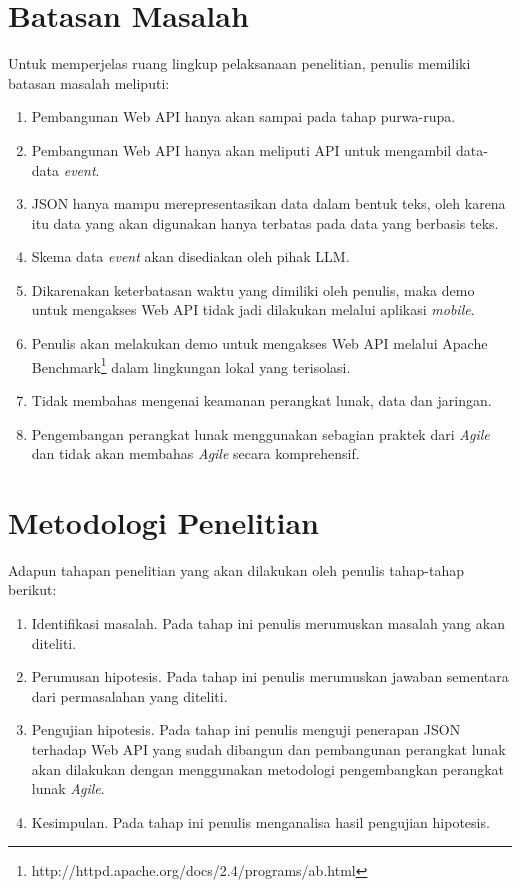 \documentclass[a4paper, 12pt, oneside]{report}
\begin{document}
\section{Batasan Masalah}
\onehalfspacing Untuk memperjelas ruang lingkup pelaksanaan penelitian, penulis memiliki batasan masalah meliputi:
\onehalfspacing
\begin{enumerate}
  \item Pembangunan Web API hanya akan sampai pada tahap purwa-rupa.
  \item Pembangunan Web API hanya akan meliputi API untuk mengambil data-data \textit{event}.
  \item JSON hanya mampu merepresentasikan data dalam bentuk teks, oleh karena itu data yang akan digunakan hanya terbatas pada data yang berbasis teks.
  \item Skema data \textit{event} akan disediakan oleh pihak LLM.
  \item Dikarenakan keterbatasan waktu yang dimiliki oleh penulis, maka demo untuk mengakses Web API tidak jadi dilakukan melalui aplikasi \textit{mobile}.
  \item Penulis akan melakukan demo untuk mengakses Web API melalui Apache Benchmark\footnote{http://httpd.apache.org/docs/2.4/programs/ab.html} dalam lingkungan lokal yang terisolasi.
  \item Tidak membahas mengenai keamanan perangkat lunak, data dan jaringan.
  \item Pengembangan perangkat lunak menggunakan sebagian praktek dari \textit{Agile} dan tidak akan membahas \textit{Agile} secara komprehensif.
\end{enumerate}

\section{Metodologi Penelitian}
\onehalfspacing Adapun tahapan penelitian yang akan dilakukan oleh penulis tahap-tahap berikut:
\begin{enumerate}
  \item Identifikasi masalah. Pada tahap ini penulis merumuskan masalah yang akan diteliti.
  \item Perumusan hipotesis. Pada tahap ini penulis merumuskan jawaban sementara dari permasalahan yang diteliti.
  \item Pengujian hipotesis. Pada tahap ini penulis menguji penerapan JSON terhadap Web API yang sudah dibangun dan pembangunan perangkat lunak akan dilakukan dengan menggunakan metodologi pengembangkan perangkat lunak \textit{Agile}. 
  \item Kesimpulan. Pada tahap ini penulis menganalisa hasil pengujian hipotesis.
\end{enumerate}
\end{document}
